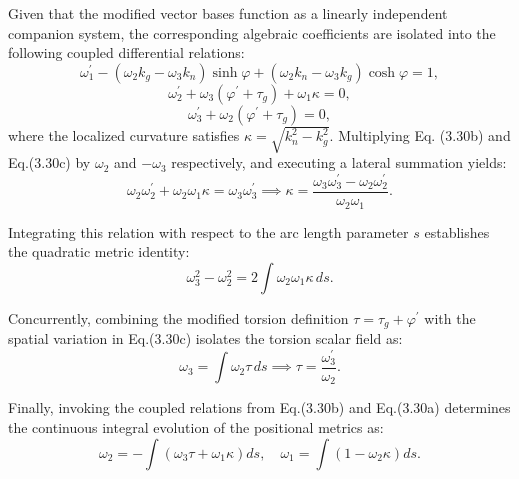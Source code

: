 \documentclass[reqno]{amsart}
\theoremstyle{plain}
\numberwithin{equation}{section}
\begin{document}
Given that the modified vector bases function as a linearly independent companion system, the corresponding algebraic coefficients are isolated into the following coupled differential relations:
\begin{equation}
\omega_{1}^{\prime} - (\omega_{2}k_{g} - \omega_{3}k_{n})\sinh\varphi + (\omega_{2}k_{n} - \omega_{3}k_{g})\cosh\varphi = 1, \tag{3.30a}
\end{equation}
\begin{equation}
\omega_{2}^{\prime} + \omega_{3}(\varphi^{\prime} + \tau_{g}) + \omega_{1}\kappa = 0, \tag{3.30b}
\end{equation}
\begin{equation}
\omega_{3}^{\prime} + \omega_{2}(\varphi^{\prime} + \tau_{g}) = 0, \tag{3.30c}
\end{equation}
where the localized curvature satisfies $\kappa = \sqrt{k_{n}^{2} - k_{g}^{2}}$. Multiplying Eq. (3.30b) and Eq.(3.30c) by $\omega_{2}$ and $-\omega_{3}$ respectively, and executing a lateral summation yields:
\begin{equation}
\omega_{2}\omega_{2}^{\prime} + \omega_{2}\omega_{1}\kappa = \omega_{3}\omega_{3}^{\prime} \implies \kappa = \frac{\omega_{3}\omega_{3}^{\prime} - \omega_{2}\omega_{2}^{\prime}}{\omega_{2}\omega_{1}}. \tag{3.31}
\end{equation}

Integrating this relation with respect to the arc length parameter $s$ establishes the quadratic metric identity:
\begin{equation}
\omega_{3}^{2} - \omega_{2}^{2} = 2\int \omega_{2}\omega_{1}\kappa \, ds. \tag{3.32}
\end{equation}

Concurrently, combining the modified torsion definition $\tau = \tau_{g} + \varphi^{\prime}$ with the spatial variation in Eq.(3.30c) isolates the torsion scalar field as:
\begin{equation}
\omega_{3} = \int \omega_{2}\tau \, ds \implies \tau = \frac{\omega_{3}^{\prime}}{\omega_{2}}. \tag{3.33}
\end{equation}

Finally, invoking the coupled relations from Eq.(3.30b) and Eq.(3.30a) determines the continuous integral evolution of the positional metrics as:
\begin{equation}
\omega_{2} = -\int \left( \omega_{3}\tau + \omega_{1}\kappa \right) ds, \quad \omega_{1} = \int \left( 1 - \omega_{2}\kappa \right) ds. \tag{3.34}
\end{equation}
\end{document}
